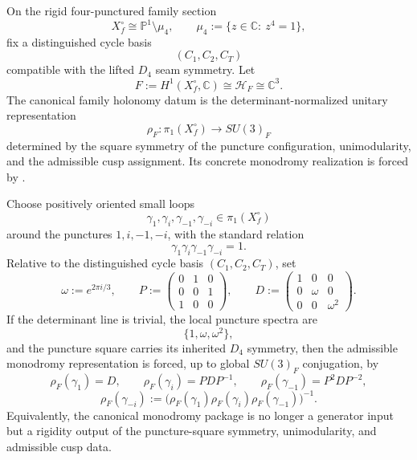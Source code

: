 \begin{definition}
\label{def:canonical-cycle-holonomy}
On the rigid four-punctured family section
\[
X_f^\circ\cong \mathbb P^1\setminus\mu_4,
\qquad
\mu_4:=\{z\in\mathbb C:\ z^4=1\},
\]
fix a distinguished cycle basis
\[
(C_1,C_2,C_T)
\]
compatible with the lifted $D_4$ seam symmetry. Let
\[
F:=H^1(X_f^\circ,\mathbb C)\cong\mathcal H_F\cong\mathbb C^3.
\]
The canonical family holonomy datum is the determinant-normalized unitary representation
\[
\rho_F:\pi_1(X_f^\circ)\to SU(3)_F
\]
determined by the square symmetry of the puncture configuration, unimodularity, and the
admissible cusp assignment. Its concrete monodromy realization is forced by
.
\end{definition}

\begin{theorem}
\label{thm:d4-monodromy-rigidity}
\label{prop:generator-family-holonomy}
\label{thm:d4-riemann-hilbert-rigidity}
Choose positively oriented small loops
\[
\gamma_1,\gamma_i,\gamma_{-1},\gamma_{-i}\in\pi_1(X_f^\circ)
\]
around the punctures $1,i,-1,-i$, with the standard relation
\[
\gamma_1\gamma_i\gamma_{-1}\gamma_{-i}=1.
\]
Relative to the distinguished cycle basis $(C_1,C_2,C_T)$, set
\[
\omega:=e^{2\pi i/3},
\qquad
P:=
\begin{pmatrix}
0&1&0\\
0&0&1\\
1&0&0
\end{pmatrix},
\qquad
D:=
\begin{pmatrix}
1&0&0\\
0&\omega&0\\
0&0&\omega^2
\end{pmatrix}.
\]
If the determinant line is trivial, the local puncture spectra are
\[
\{1,\omega,\omega^2\},
\]
and the puncture square carries its inherited $D_4$ symmetry, then the admissible monodromy
representation is forced, up to global $SU(3)_F$ conjugation, by
\[
\rho_F(\gamma_1)=D,
\qquad
\rho_F(\gamma_i)=PDP^{-1},
\qquad
\rho_F(\gamma_{-1})=P^2DP^{-2},
\]
\[
\rho_F(\gamma_{-i})
:=
\bigl(\rho_F(\gamma_1)\rho_F(\gamma_i)\rho_F(\gamma_{-1})\bigr)^{-1}.
\]
Equivalently, the canonical monodromy package is no longer a generator input but a rigidity output
of the puncture-square symmetry, unimodularity, and admissible cusp data.
\end{theorem}

